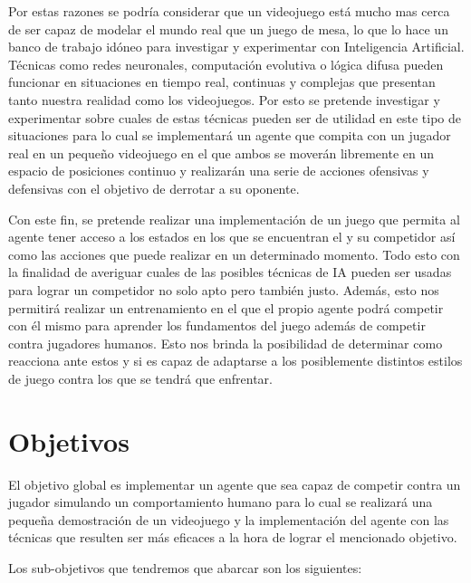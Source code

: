 \bigskip

Por estas razones se podría considerar que un videojuego está mucho mas cerca de ser capaz de modelar el mundo real que un juego de mesa, lo que lo hace un banco de trabajo idóneo para investigar y experimentar con Inteligencia Artificial. Técnicas como redes neuronales, computación evolutiva o lógica difusa pueden funcionar en situaciones en tiempo real, continuas y complejas que presentan tanto nuestra realidad como los videojuegos. Por esto se pretende investigar y experimentar sobre cuales de estas técnicas pueden ser de utilidad en este tipo de situaciones para lo cual se implementará un agente que compita con un jugador real en un pequeño videojuego en el que ambos se moverán libremente en un espacio de posiciones continuo y realizarán una serie de acciones ofensivas y defensivas con el objetivo de derrotar a su oponente.

\bigskip

Con este fin, se pretende realizar una implementación de un juego que permita al agente tener acceso a los estados en los que se encuentran el y su competidor así como las acciones que puede realizar en un determinado momento. Todo esto con la finalidad de averiguar cuales de las posibles técnicas de IA pueden ser usadas para lograr un competidor no solo apto pero también justo. Además, esto nos permitirá realizar un entrenamiento en el que el propio agente podrá competir con él mismo para aprender los fundamentos del juego además de competir contra jugadores humanos. Esto nos brinda la posibilidad de determinar como reacciona ante estos y si es capaz de adaptarse a los posiblemente distintos estilos de juego contra los que se tendrá que enfrentar.

\section{Objetivos}

El objetivo global es implementar un agente que sea capaz de competir contra un jugador simulando un comportamiento humano para lo cual se realizará una pequeña demostración de un videojuego y la implementación del agente con las técnicas que resulten ser más eficaces a la hora de lograr el mencionado objetivo.

\bigskip

Los sub-objetivos que tendremos que abarcar son los siguientes:

